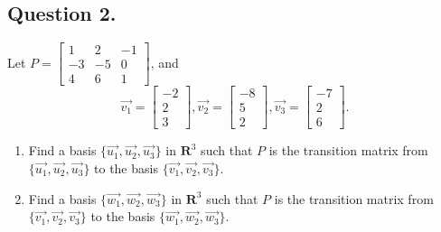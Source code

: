 \documentclass{article}
\begin{document}
\subsection*{Question 2.}
Let $P=\left[\begin{array}{rrr}
1 & 2 &-1 \\
-3 & -5 & 0 \\
4 & 6 & 1
\end{array}\right]$, and
\[\Vec{v_1}=\left[\begin{array}{c}-2\\2\\3\end{array}\right],\Vec{v_2}=\left[\begin{array}{c}-8\\5\\2\end{array}\right],\Vec{v_3}=\left[\begin{array}{c}-7\\2\\6\end{array}\right].\]
\begin{enumerate} [label={(\arabic*)}]
\item Find a basis $\{\Vec{u_1},\Vec{u_2},\Vec{u_3}\}$ in $\mathbf{R}^3$ such that $P$ is the transition matrix from $\{\Vec{u_1},\Vec{u_2},\Vec{u_3}\}$ to the basis $\{\Vec{v_1},\Vec{v_2},\Vec{v_3}\}$.
\item Find a basis $\{\Vec{w_1},\Vec{w_2},\Vec{w_3}\}$ in $\mathbf{R}^3$ such that $P$ is the transition matrix from $\{\Vec{v_1},\Vec{v_2},\Vec{v_3}\}$ to the basis $\{\Vec{w_1},\Vec{w_2},\Vec{w_3}\}$.
\end{enumerate}
\end{document}
